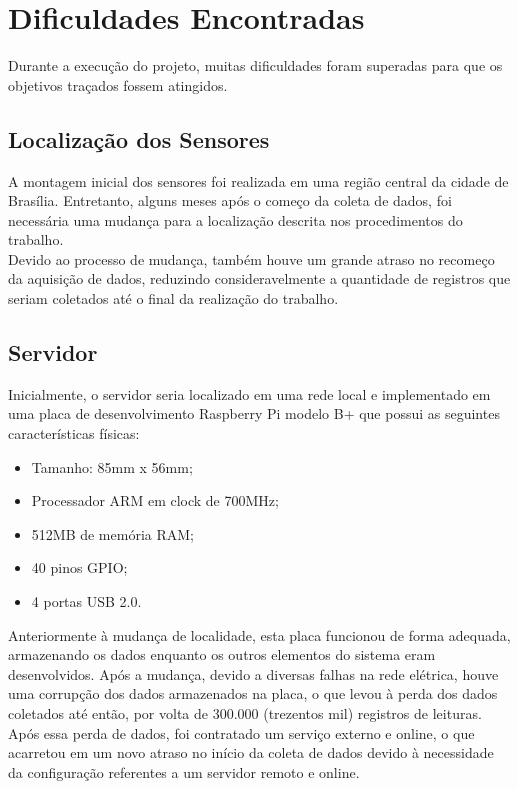 \section{Dificuldades Encontradas}
\label{sec:dificuldades}
\quad Durante a execução do projeto, muitas dificuldades foram superadas para que os objetivos traçados fossem atingidos.
\subsection{Localização dos Sensores}
\quad A montagem inicial dos sensores foi realizada em uma região central da cidade de Brasília. Entretanto, alguns meses após o começo da coleta de dados, foi necessária uma mudança para a localização descrita nos procedimentos do trabalho.
\\\null \quad Devido ao processo de mudança, também houve um grande atraso no recomeço da aquisição de dados, reduzindo consideravelmente a quantidade de registros que seriam coletados até o final da realização do trabalho.

\subsection{Servidor}
\quad Inicialmente, o servidor seria localizado em uma rede local e implementado em uma placa de desenvolvimento Raspberry Pi modelo B+ que possui as seguintes características físicas:
\begin{itemize}
  \item Tamanho: 85mm x 56mm;
  \item Processador ARM em clock de 700MHz;
  \item 512MB de memória RAM;
  \item 40 pinos GPIO;
  \item 4 portas USB 2.0.
\end{itemize}
\null\quad Anteriormente à mudança de localidade, esta placa funcionou de forma adequada, armazenando os dados enquanto os outros elementos do sistema eram desenvolvidos. Após a mudança, devido a diversas falhas na rede elétrica, houve uma corrupção dos dados armazenados na placa, o que levou à perda dos dados coletados até então, por volta de 300.000 (trezentos mil) registros de leituras. Após essa perda de dados, foi contratado um serviço externo e online, o que acarretou em um novo atraso no início da coleta de dados devido à necessidade da configuração referentes a um servidor remoto e online.

